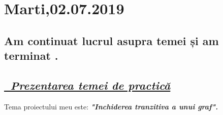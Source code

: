 \documentclass{report}
\begin{document}
\chapter{Marti,02.07.2019}
\section  {Am continuat lucrul asupra temei și am terminat .}


 \section { \textbf    {\emph{\underline{ \  Prezentarea temei de practică}}}}

 Tema proiectului meu este:\textbf{ \emph { "Inchiderea tranzitiva a unui graf".}}
\begin{flushleft}


\end{flushleft}
\end{document}
